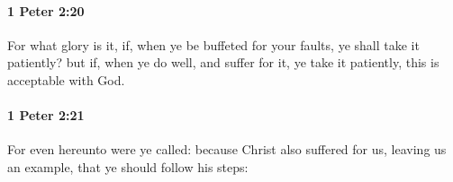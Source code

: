 		\paragraph{1 Peter 2:20} %
			\label{1PETER-2-20}

			For what glory is it, if, when ye be buffeted for your faults, ye shall take it patiently?  but if, when ye do well, and suffer for it, ye take it patiently, this is acceptable with God.

			\begin{framed}
			\scriptsize
				\begin{compactdesc}
					\item[SBLG] 
				\end{compactdesc}
			\end{framed}

		\paragraph{1 Peter 2:21} %
			\label{1PETER-2-21}

			For even hereunto were ye called: because Christ also suffered for us, leaving us an example, that ye should follow his steps:

